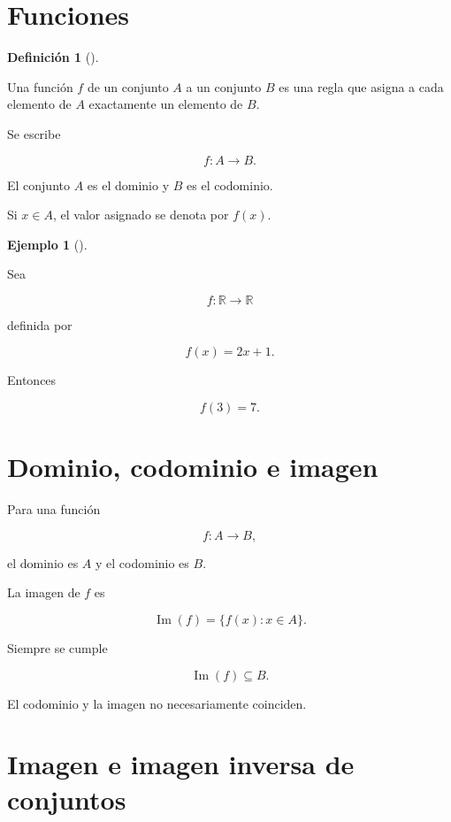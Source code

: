 \documentclass[
  spanish,
  11pt,
  letterpaper,
  DIV=11,
  numbers=noendperiod]{scrreprt}
\theoremstyle{definition}
\newtheorem{definition}{Definición}[chapter]
\theoremstyle{plain}
\theoremstyle{definition}
\newtheorem{example}{Ejemplo}[chapter]
\theoremstyle{remark}
\begin{document}
\section{Funciones}\label{funciones}

\begin{definition}[]\protect\hypertarget{def-funcion}{}\label{def-funcion}

Una función \(f\) de un conjunto \(A\) a un conjunto \(B\) es una regla
que asigna a cada elemento de \(A\) exactamente un elemento de \(B\).

\end{definition}

Se escribe

\[
f:A\longrightarrow B.
\]

El conjunto \(A\) es el dominio y \(B\) es el codominio.

Si \(x\in A\), el valor asignado se denota por \(f(x)\).

\begin{example}[]\protect\hypertarget{exm-funcion-real}{}\label{exm-funcion-real}

Sea

\[
f:\mathbb{R}\longrightarrow\mathbb{R}
\]

definida por

\[
f(x)=2x+1.
\]

Entonces

\[
f(3)=7.
\]

\end{example}

\section{Dominio, codominio e imagen}\label{dominio-codominio-e-imagen}

Para una función

\[
f:A\to B,
\]

el dominio es \(A\) y el codominio es \(B\).

La imagen de \(f\) es

\[
\operatorname{Im}(f)
=
\{f(x):x\in A\}.
\]

Siempre se cumple

\[
\operatorname{Im}(f)\subseteq B.
\]

El codominio y la imagen no necesariamente coinciden.

\section{Imagen e imagen inversa de
conjuntos}\label{imagen-e-imagen-inversa-de-conjuntos}
\end{document}
